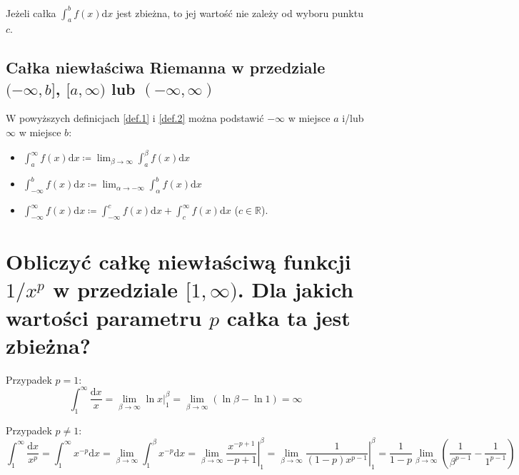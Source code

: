 \documentclass{article}
\theoremstyle{definition}
\theoremstyle{case}
\begin{document}
Jeżeli całka $\int_a^b f(x) \mathrm{d}x$ jest zbieżna, to jej wartość nie zależy od wyboru punktu $c$.

\subsection{Całka niewłaściwa Riemanna w przedziale
\texorpdfstring{$(-\infty,b]$}{(-inf,b]},
\texorpdfstring{$[a,\infty)$}{[a,+inf)} lub
	\texorpdfstring{$(-\infty,\infty)$}{(-inf,+inf)}
}
W powyższych definicjach \ref{def.1} i \ref{def.2} można podstawić $-\infty$ w miejsce $a$ i/lub $\infty$ w miejsce $b$:
\begin{itemize}
	\item
		$\int_a^{\infty} f(x) \mathrm{d}x
		\coloneqq
		\lim_{\beta \to \infty} \int_a^{\beta} f(x) \mathrm{d}x$
	\item
		$\int_{-\infty}^b f(x) \mathrm{d}x
		\coloneqq
		\lim_{\alpha \to -\infty} \int_{\alpha}^b f(x) \mathrm{d}x$
	\item
		$\int_{-\infty}^{\infty} f(x) \mathrm{d}x
		\coloneqq
		\int_{-\infty}^{c} f(x) \mathrm{d}x + \int_{c}^{\infty} f(x) \mathrm{d}x$ ($c \in \mathbb{R}$).
\end{itemize}

\section{Obliczyć całkę niewłaściwą funkcji
	\texorpdfstring{$ 1 / x^p $}{1/x\textasciicircum p}
	w przedziale
	\texorpdfstring{$ [ 1, \infty ) $}{[1,inf)}.
	Dla jakich wartości parametru $p$ całka ta jest zbieżna?}

	Przypadek $p=1$:
	\begin{equation*}
		\int_1^\infty \frac{\mathrm{d}x}{x}
		= \lim_{\beta \to \infty} \left. \ln x \right|_1^{\beta}
		= \lim_{\beta \to \infty} (\ln \beta -\ln 1)
		= \infty
	\end{equation*}

	Przypadek $p\neq 1$:
	\begin{equation*}
		\int_1^{\infty}\frac{\mathrm{d}x}{x^p}
		= \int_1^{\infty} x^{-p} \mathrm{d}x
		= \lim_{\beta \to \infty}\int_1^\beta x^{-p} \mathrm{d}x
		= \lim_{\beta \to \infty} \left. \frac{x^{-p+1}}{-p+1} \right|_1^\beta
		= \lim_{\beta \to \infty} \left. \frac{1}{(1-p)x^{p-1}} \right|_1^\beta
		= \frac{1}{1-p} \lim_{\beta \to \infty} \left( \frac{1}{\beta^{p-1}} - \frac{1}{1^{p-1}} \right)
	\end{equation*}
\end{document}
